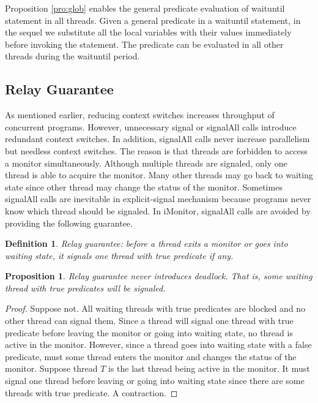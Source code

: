 \documentclass[preprint]{sigplanconf}
\newtheorem{definition}{Definition}
\newtheorem{proposition}{Proposition}
\begin{document}
Proposition \ref{pro:glob} enables the general predicate evaluation of
waituntil statement in all threads. 
Given a general predicate in a waituntil statement, in the sequel we substitute
all the local variables with their values immediately before invoking the
statement. The predicate can be evaluated in all other threads during the
waituntil period. 

\subsection{Relay Guarantee}
As mentioned earlier, reducing context switches increases throughput of
concurrent programs. However, unnecessary signal or signalAll calls introduce
redundant context switches. In addition, signalAll calls never increase 
parallelism but needless context switches. The reason is that threads are 
forbidden to access a monitor simultaneously. Although multiple threads are
signaled, only one thread is able to acquire the monitor. Many other threads
may go back to waiting state since other thread may change the status of the 
monitor. Sometimes signalAll calls are inevitable in explicit-signal 
mechanism because programs never know which thread should be signaled. In
iMonitor, signalAll calls are avoided by providing the following guarantee. 

\begin{definition}{Relay guarantee:}
    before a thread exits a monitor or goes into waiting state, it
    signals one thread with true predicate if any.
\end{definition}
\begin{proposition} \label{pro:one}
    Relay guarantee never introduces deadlock. That is,
    some waiting thread with true predicates will be signaled. 
\end{proposition}
\begin{proof}
    Suppose not. All waiting threads with true predicates are blocked and 
    no other thread can signal them. Since a thread will signal one thread with
    true predicate before leaving the monitor or going into waiting state, no 
    thread is active in the monitor.  However, since a thread goes into waiting 
    state with a false predicate, must some thread enters the monitor and
    changes the status of the monitor. Suppose thread $T$ is the last thread 
    being active in the monitor. It must signal one thread before leaving or 
    going into waiting state since there are some threads with true predicate. 
    A contraction. 
\end{proof}
\end{document}
